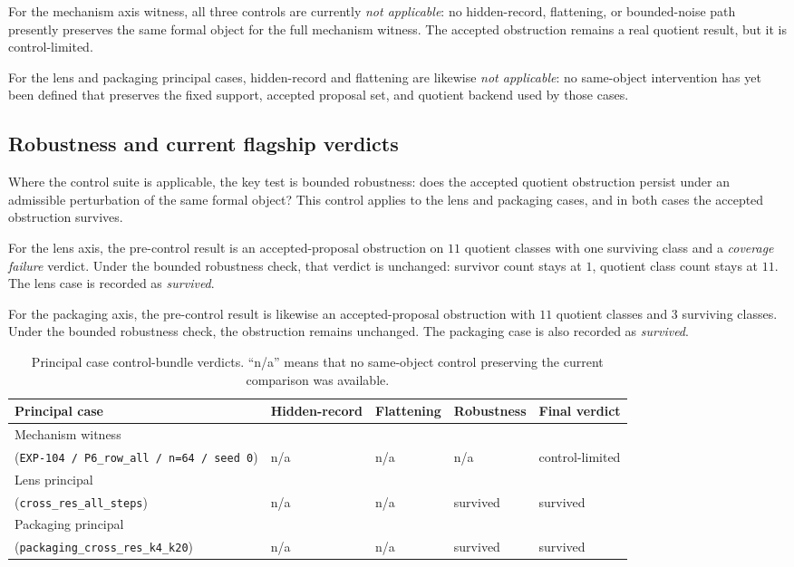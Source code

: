 \documentclass[11pt]{article}
\theoremstyle{definition}
\begin{document}
For the mechanism axis witness, all three controls are currently \emph{not applicable}: no hidden-record, flattening, or bounded-noise path presently preserves the same formal object for the full mechanism witness. The accepted obstruction remains a real quotient result, but it is control-limited.

For the lens and packaging principal cases, hidden-record and flattening are likewise \emph{not applicable}: no same-object intervention has yet been defined that preserves the fixed support, accepted proposal set, and quotient backend used by those cases.

\subsection{Robustness and current flagship verdicts}

Where the control suite is applicable, the key test is bounded robustness: does the accepted quotient obstruction persist under an admissible perturbation of the same formal object? This control applies to the lens and packaging cases, and in both cases the accepted obstruction survives.

For the lens axis, the pre-control result is an accepted-proposal obstruction on \(11\) quotient classes with one surviving class and a \emph{coverage failure} verdict. Under the bounded robustness check, that verdict is unchanged: survivor count stays at \(1\), quotient class count stays at \(11\). The lens case is recorded as \emph{survived}.

For the packaging axis, the pre-control result is likewise an accepted-proposal obstruction with \(11\) quotient classes and \(3\) surviving classes. Under the bounded robustness check, the obstruction remains unchanged. The packaging case is also recorded as \emph{survived}.

\begin{table}[t]
    \centering
    \caption{Principal case control-bundle verdicts. ``n/a'' means that no same-object control preserving the current comparison was available.}
    \label{tab:flagship-control-summary}
    \footnotesize
    \begin{tabularx}{\linewidth}{>{\raggedright\arraybackslash}X>{\raggedright\arraybackslash}p{1.8cm}>{\raggedright\arraybackslash}p{1.8cm}>{\raggedright\arraybackslash}p{1.9cm}>{\raggedright\arraybackslash}p{2.0cm}}
        \toprule
        Principal case & Hidden-record & Flattening & Robustness & Final verdict \\
        \midrule
        Mechanism witness\\(\texttt{EXP-104 / P6\_row\_all / n=64 / seed 0}) & n/a & n/a & n/a & control-limited \\
        Lens principal\\(\texttt{cross\_res\_all\_steps}) & n/a & n/a & survived & survived \\
        Packaging principal\\(\texttt{packaging\_cross\_res\_k4\_k20}) & n/a & n/a & survived & survived \\
        \bottomrule
    \end{tabularx}
\end{table}
\end{document}
